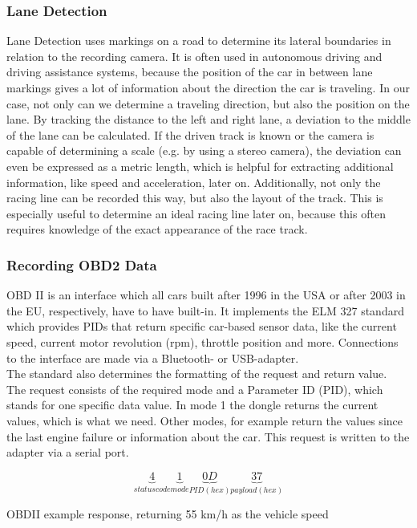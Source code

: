\subsubsection{Lane Detection}
Lane Detection uses markings on a road to determine its lateral boundaries in relation to the recording camera. It is often used in autonomous driving and driving assistance systems, because the position of the car in between lane markings gives a lot of information about the direction the car is traveling. 
In our case, not only can we determine a traveling direction, but also the position on the lane.
By tracking the distance to the left and right lane, a deviation to the middle of the lane can be calculated. 
If the driven track is known or the camera is capable of determining a scale (e.g. by using a stereo camera), the deviation can even be expressed as a metric length, which is helpful for extracting additional information, like speed and acceleration, later on.
Additionally, not only the racing line can be recorded this way, but also the layout of the track. This is especially useful to determine an ideal racing line later on, because this often requires knowledge of the exact appearance of the race track.

\subsubsection{Recording OBD2 Data}
OBD II is an interface which all cars built after 1996 in the USA or after 2003 in the EU, respectively, have to have built-in. It implements the ELM 327 standard which provides PIDs that return specific car-based sensor data, like the current speed, current motor revolution (rpm), throttle position and more. Connections to the interface are made via a Bluetooth- or USB-adapter.\\
The standard also determines the formatting of the request and return value.\\
The request consists of the required mode and a Parameter ID (PID), which stands for one specific data value. In mode 1 the dongle returns the current values, which is what we need. Other modes, for example return the values since the last engine failure or information about the car. This request is written to the adapter via a serial port.

\begin{equation}
	\label{eq:obd_example}
		\underbrace{4}_{status code}
		\underbrace{1}_{mode}
		\underbrace{0D}_{PID (hex)}
		\underbrace{37}_{payload (hex)}
\end{equation}
\begin{center}
	OBDII example response, returning 55 km/h as the vehicle speed
\end{center}

